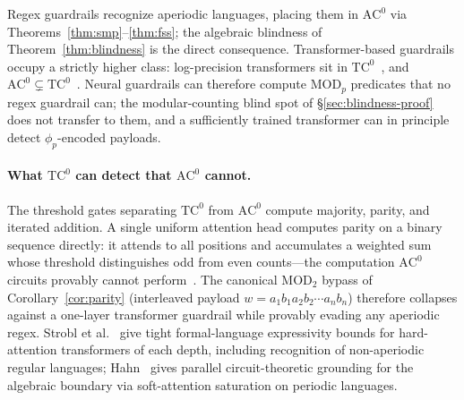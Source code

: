 \documentclass[letterpaper,twocolumn,10pt]{article}
\theoremstyle{definition}
\theoremstyle{remark}
\begin{document}
Regex guardrails recognize aperiodic languages, placing them in
$\mathrm{AC}^0$ via Theorems~\ref{thm:smp}--\ref{thm:fss}; the algebraic
blindness of Theorem~\ref{thm:blindness} is the direct consequence.
Transformer-based guardrails occupy a strictly higher class: log-precision
transformers sit in $\mathrm{TC}^0$~\cite{merrill2023saturated,chiang2023tighter},
and $\mathrm{AC}^0 \subsetneq \mathrm{TC}^0$~\cite{furst1981,hastad1987}.
Neural guardrails can therefore compute $\mathrm{MOD}_p$ predicates that
no regex guardrail can; the modular-counting blind spot of
\S\ref{sec:blindness-proof} does not transfer to them, and a sufficiently
trained transformer can in principle detect $\phi_p$-encoded payloads.

\begin{table}[!htbp]
\centering
\caption{Circuit complexity of guardrail architectures. $\mathrm{AC}^0 \subsetneq
\mathrm{TC}^0$; both are conjectured to be strictly contained in $\mathrm{NC}^1$.}
\label{tab:circuit-complexity}
\setlength{\tabcolsep}{4pt}
\end{table}

\paragraph{What $\mathrm{TC}^0$ can detect that $\mathrm{AC}^0$ cannot.}
The threshold gates separating $\mathrm{TC}^0$ from $\mathrm{AC}^0$ compute
majority, parity, and iterated addition.
A single uniform attention head computes parity on a binary sequence
directly: it attends to all positions and accumulates a weighted sum
whose threshold distinguishes odd from even counts---the computation
$\mathrm{AC}^0$ circuits provably cannot
perform~\cite{furst1981,hastad1987}.
The canonical $\mathrm{MOD}_2$ bypass of Corollary~\ref{cor:parity}
(interleaved payload $w = a_1 b_1 a_2 b_2 \cdots a_n b_n$) therefore
collapses against a one-layer transformer guardrail while provably
evading any aperiodic regex.
Strobl et al.~\cite{strobl2024formal} give tight formal-language
expressivity bounds for hard-attention transformers of each depth,
including recognition of non-aperiodic regular languages;
Hahn~\cite{hahn2020limitations} gives parallel circuit-theoretic grounding
for the algebraic boundary via soft-attention saturation on periodic
languages.
\end{document}
